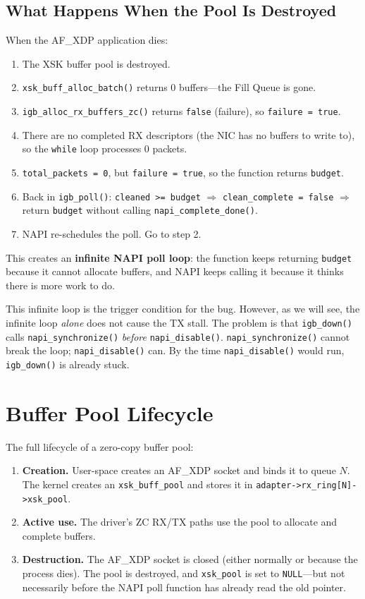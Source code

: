 \documentclass[11pt,a4paper,openany]{book}
\newcommand{\func}[1]{\texttt{#1()}}
\newcommand{\sym}[1]{\texttt{#1}}
\begin{document}
\subsection{What Happens When the Pool Is Destroyed}

When the AF\_XDP application dies:
\begin{enumerate}
\item The XSK buffer pool is destroyed.
\item \func{xsk\_buff\_alloc\_batch} returns 0 buffers---the Fill Queue
    is gone.
\item \func{igb\_alloc\_rx\_buffers\_zc} returns \texttt{false}
    (failure), so \texttt{failure = true}.
\item There are no completed RX descriptors (the NIC has no buffers
    to write to), so the \texttt{while} loop processes 0 packets.
\item \texttt{total\_packets = 0}, but \texttt{failure = true}, so the
    function returns \texttt{budget}.
\item Back in \func{igb\_poll}: \texttt{cleaned >= budget} $\Rightarrow$
    \texttt{clean\_complete = false} $\Rightarrow$ return \texttt{budget}
    without calling \func{napi\_complete\_done}.
\item NAPI re-schedules the poll.  Go to step 2.
\end{enumerate}

This creates an \textbf{infinite NAPI poll loop}: the function keeps
returning \texttt{budget} because it cannot allocate buffers, and NAPI
keeps calling it because it thinks there is more work to do.

This infinite loop is the trigger condition for the bug.  However, as we
will see, the infinite loop \emph{alone} does not cause the TX stall.
The problem is that \func{igb\_down} calls \func{napi\_synchronize}
\emph{before} \func{napi\_disable}.  \func{napi\_synchronize} cannot
break the loop; \func{napi\_disable} can.  By the time
\func{napi\_disable} would run, \func{igb\_down} is already stuck.

\section{Buffer Pool Lifecycle}

The full lifecycle of a zero-copy buffer pool:

\begin{enumerate}
\item \textbf{Creation.}  User-space creates an AF\_XDP socket and binds
    it to queue $N$.  The kernel creates an \sym{xsk\_buff\_pool} and
    stores it in \texttt{adapter->rx\_ring[N]->xsk\_pool}.
\item \textbf{Active use.}  The driver's ZC RX/TX paths use the pool to
    allocate and complete buffers.
\item \textbf{Destruction.}  The AF\_XDP socket is closed (either
    normally or because the process dies).  The pool is destroyed, and
    \texttt{xsk\_pool} is set to \texttt{NULL}---but not necessarily
    before the NAPI poll function has already read the old pointer.
\end{enumerate}
\end{document}
